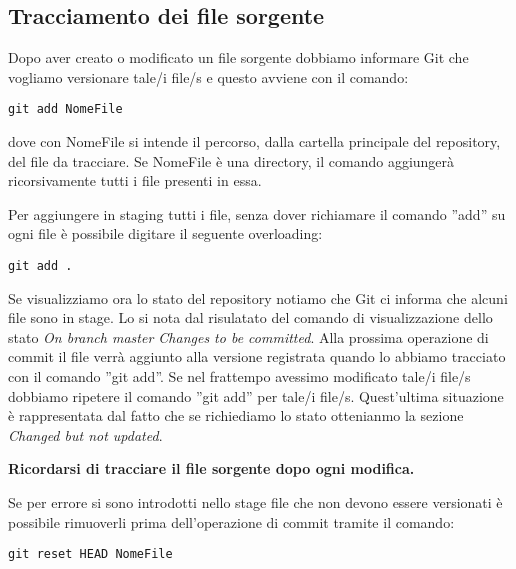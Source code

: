 \subsection{Tracciamento dei file sorgente}
Dopo aver creato o modificato un file sorgente dobbiamo informare Git che vogliamo versionare tale/i file/s e questo avviene con il comando:

\begin{center}
\texttt{git add NomeFile}
\end{center}

dove con NomeFile si intende il percorso, dalla cartella principale del repository, del file da tracciare. Se NomeFile è una directory, il comando aggiungerà ricorsivamente tutti i file presenti in essa.

Per aggiungere in staging tutti i file, senza dover richiamare il comando ''add'' su ogni file è possibile digitare il seguente overloading:

\begin{center}
\texttt{git add .}
\end{center}

Se visualizziamo ora lo stato del repository notiamo che Git ci informa che alcuni file sono in stage. Lo si nota dal risulatato del comando di visualizzazione dello stato \textit{On branch master Changes to be committed}. Alla prossima operazione di commit il file verrà aggiunto alla versione registrata quando lo abbiamo tracciato con il comando ''git add''. Se nel frattempo avessimo modificato tale/i file/s dobbiamo ripetere il comando ''git add'' per tale/i file/s. Quest'ultima situazione è rappresentata dal fatto che se richiediamo lo stato ottenianmo la sezione \textit{Changed but not updated}.

\begin{center}
\textbf{Ricordarsi di tracciare il file sorgente dopo ogni modifica.}
\end{center}

Se per errore si sono introdotti nello stage file che non devono essere versionati è possibile rimuoverli prima dell'operazione di commit tramite il comando:

\begin{center}
\texttt{git reset HEAD NomeFile}
\end{center}